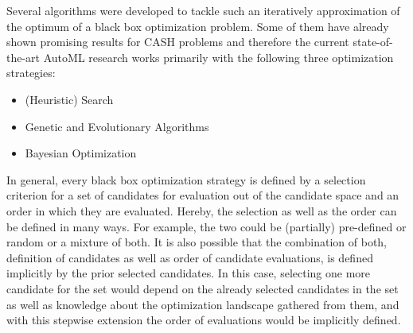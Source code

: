 Several algorithms were developed to tackle such an iteratively approximation of the optimum of a black box optimization problem.
Some of them have already shown promising results for CASH problems and therefore the current state-of-the-art AutoML research works primarily with the following three optimization strategies:
\begin{itemize}
    \item (Heuristic) Search
    \item Genetic and Evolutionary Algorithms
    \item Bayesian Optimization
\end{itemize}
In general, every black box optimization strategy is defined by a selection criterion for a set of candidates for evaluation out of the candidate space and an order in which they are evaluated.
Hereby, the selection as well as the order can be defined in many ways.
For example, the two could be (partially) pre-defined or random or a mixture of both.
It is also possible that the combination of both, definition of candidates as well as order of candidate evaluations, is defined implicitly by the prior selected candidates.
In this case, selecting one more candidate for the set would depend on the already selected candidates in the set as well as knowledge about the optimization landscape gathered from them, and with this stepwise extension the order of evaluations would be implicitly defined.

